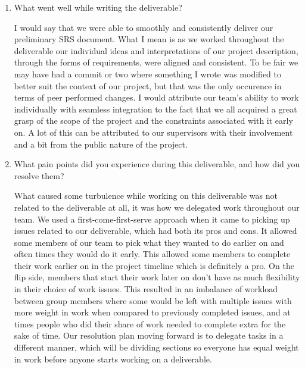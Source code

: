 \begin{enumerate}
  \item What went well while writing the deliverable?
  \par{I would say that we were able to smoothly and consistently deliver our preliminary SRS document. What I mean is as we worked throughout the deliverable 
  our individual ideas and interpretations of our project description, through the forms of requirements, were aligned and consistent. To be fair we may have had 
  a commit or two where something I wrote was modified to better suit the context of our project, but that was the only occurence in terms of peer performed changes. 
  I would attribute our team's ability to work individually with seamless integration to the fact that we all acquired a great grasp of the scope of the project and 
  the constraints associated with it early on. A lot of this can be attributed to our supervisors with their involvement and a bit from the public nature of the project.}

  \item What pain points did you experience during this deliverable, and how did
  you resolve them?
  \par{What caused some turbulence while working on this deliverable was not related to the deliverable at all, it was how we delegated work throughout our team. 
  We used a first-come-first-serve approach when it came to picking up issues related to our deliverable, which had both its pros and cons. It allowed some 
  members of our team to pick what they wanted to do earlier on and often times they would do it early. This allowed some members to complete their 
  work earlier on in the project timeline which is definitely a pro. On the flip side, members that start their work later on don't have as much flexibility in 
  their choice of work issues. This resulted in an imbalance of workload between group members where some would be left with multiple issues with more weight in 
  work when compared to previously completed issues, and at times people who did their share of work needed to complete extra for the sake of time. Our resolution plan 
  moving forward is to delegate tasks in a different manner, which will be dividing sections so everyone has equal weight in work before anyone starts working 
  on a deliverable.
  }


\end{enumerate}
